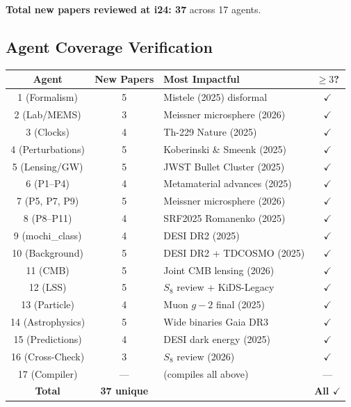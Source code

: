 \documentclass[11pt]{article}
\begin{document}
\textbf{Total new papers reviewed at i24: 37} across 17 agents.

\subsection{Agent Coverage Verification}

\begin{center}
\begin{tabular}{cclc}
\toprule
\textbf{Agent} & \textbf{New Papers} & \textbf{Most Impactful} & \textbf{$\geq 3$?} \\
\midrule
1 (Formalism) & 5 & Mistele (2025) disformal & $\checkmark$ \\
2 (Lab/MEMS) & 3 & Meissner microsphere (2026) & $\checkmark$ \\
3 (Clocks) & 4 & Th-229 Nature (2025) & $\checkmark$ \\
4 (Perturbations) & 5 & Koberinski \& Smeenk (2025) & $\checkmark$ \\
5 (Lensing/GW) & 5 & JWST Bullet Cluster (2025) & $\checkmark$ \\
6 (P1--P4) & 4 & Metamaterial advances (2025) & $\checkmark$ \\
7 (P5, P7, P9) & 5 & Meissner microsphere (2026) & $\checkmark$ \\
8 (P8--P11) & 4 & SRF2025 Romanenko (2025) & $\checkmark$ \\
9 (mochi\_class) & 4 & DESI DR2 (2025) & $\checkmark$ \\
10 (Background) & 5 & DESI DR2 + TDCOSMO (2025) & $\checkmark$ \\
11 (CMB) & 5 & Joint CMB lensing (2026) & $\checkmark$ \\
12 (LSS) & 5 & $S_8$ review + KiDS-Legacy & $\checkmark$ \\
13 (Particle) & 4 & Muon $g-2$ final (2025) & $\checkmark$ \\
14 (Astrophysics) & 5 & Wide binaries Gaia DR3 & $\checkmark$ \\
15 (Predictions) & 4 & DESI dark energy (2025) & $\checkmark$ \\
16 (Cross-Check) & 3 & $S_8$ review (2026) & $\checkmark$ \\
17 (Compiler) & --- & (compiles all above) & --- \\
\midrule
\textbf{Total} & \textbf{37 unique} & & \textbf{All $\checkmark$} \\
\bottomrule
\end{tabular}
\end{center}
\end{document}
